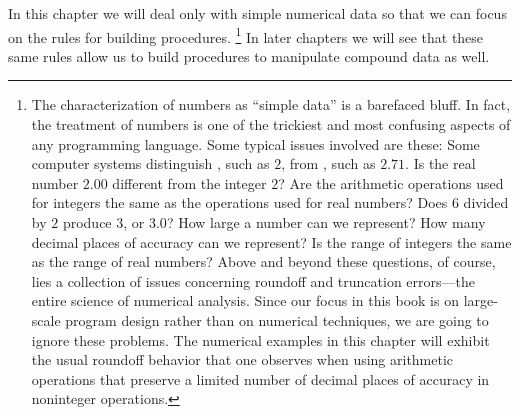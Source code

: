 In this chapter we will deal only with simple numerical data so that we can focus on the rules for building procedures.%
\footnote{
	The characterization of numbers as “simple data” is a barefaced bluff.
	In fact, the treatment of numbers is one of the trickiest and most confusing aspects of any programming language.
	Some typical issues involved are these:
	Some computer systems distinguish , such as \( 2 \), from , such as \( 2.71 \).
	Is the real number \( 2.00 \) different from the integer \( 2 \)?
	Are the arithmetic operations used for integers the same as the operations used for real numbers?
	Does \( 6 \) divided by \( 2 \) produce \( 3 \), or \( 3.0 \)?
	How large a number can we represent?
	How many decimal places of accuracy can we represent?
	Is the range of integers the same as the range of real numbers?
	Above and beyond these questions, of course, lies a collection of issues concerning roundoff and truncation errors---the entire science of numerical analysis.
	Since our focus in this book is on large-scale program design rather than on numerical techniques, we are going to ignore these problems.
	The numerical examples in this chapter will exhibit the usual roundoff behavior that one observes when using arithmetic operations that preserve a limited number of decimal places of accuracy in noninteger operations.
}
In later chapters we will see that these same rules allow us to build procedures to manipulate compound data as well.









